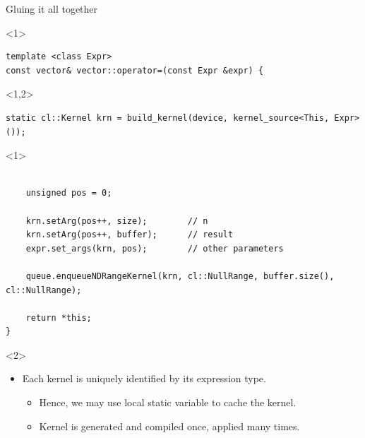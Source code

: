 \documentclass[@BEAMER_OPTIONS@]{beamer}
\begin{document}
\begin{frame}[fragile]{Gluing it all together}
    \begin{exampleblock}{}
        \begin{uncoverenv}<1>
            \begin{lstlisting}
template <class Expr>
const vector& vector::operator=(const Expr &expr) {
            \end{lstlisting}
        \end{uncoverenv}
        \begin{uncoverenv}<1,2>
            \begin{lstlisting}[firstnumber=last]
    static cl::Kernel krn = build_kernel(device, kernel_source<This, Expr>());
            \end{lstlisting}
        \end{uncoverenv}
        \begin{uncoverenv}<1>
            \begin{lstlisting}[firstnumber=last]

    unsigned pos = 0;

    krn.setArg(pos++, size);        // n
    krn.setArg(pos++, buffer);      // result
    expr.set_args(krn, pos);        // other parameters

    queue.enqueueNDRangeKernel(krn, cl::NullRange, buffer.size(), cl::NullRange);

    return *this;
}
            \end{lstlisting}
        \end{uncoverenv}
    \end{exampleblock}
    \begin{uncoverenv}<2>
        \begin{itemize}
            \item Each kernel is uniquely identified by its expression type.
                \begin{itemize}
                    \item Hence, we may use local static variable to cache the
                        kernel.
                    \item Kernel is generated and compiled once, applied many
                        times.
                \end{itemize}
        \end{itemize}
    \end{uncoverenv}
\end{frame}
\end{document}
